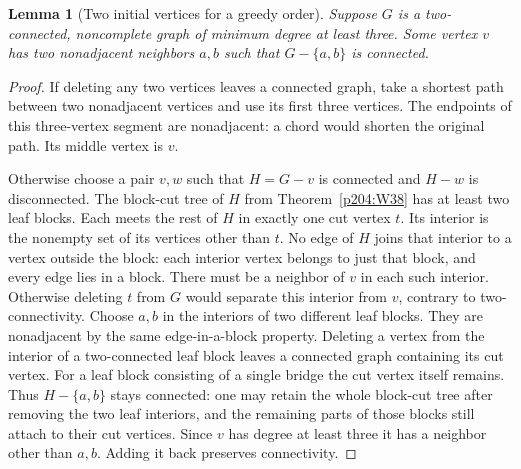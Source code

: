 \documentclass[11pt,oneside,openany]{book}
\theoremstyle{plain}
\newtheorem{lemma}[theorem]{Lemma}
\theoremstyle{definition}
\theoremstyle{remark}
\begin{document}
\begin{lemma}[Two initial vertices for a greedy order]
\label{p204:brooks-order}
Suppose \(G\) is a two-connected, noncomplete graph of minimum degree
at least three. Some vertex \(v\) has two nonadjacent neighbors
\(a,b\) such that \(G-\{a,b\}\) is connected.
\end{lemma}
\begin{proof}
If deleting any two vertices leaves a connected graph, take a shortest
path between two nonadjacent vertices and use its first three
vertices. The endpoints of this three-vertex segment are nonadjacent:
a chord would shorten the original path. Its middle vertex is \(v\).

Otherwise choose a pair \(v,w\) such that \(H=G-v\) is connected
and \(H-w\) is disconnected. The block-cut tree of \(H\) from
Theorem~\ref{p204:W38} has at least two leaf blocks. Each meets
the rest of \(H\) in exactly one cut vertex \(t\). Its interior is
the nonempty set of its vertices other than \(t\). No edge of \(H\)
joins that interior to a vertex outside the block: each interior
vertex belongs to just that block, and every edge lies in a block.
There must be a neighbor of \(v\) in each such interior. Otherwise
deleting \(t\) from \(G\) would separate this interior from \(v\),
contrary to two-connectivity. Choose \(a,b\) in the interiors of
two different leaf blocks. They are nonadjacent by the same
edge-in-a-block property. Deleting a vertex from the interior of a
two-connected leaf block leaves a connected graph containing its
cut vertex. For a leaf block consisting of a single bridge the
cut vertex itself remains. Thus \(H-\{a,b\}\) stays connected:
one may retain the whole block-cut tree after removing the two
leaf interiors, and the remaining parts of those blocks still
attach to their cut vertices. Since \(v\) has degree at least
three it has a neighbor other than \(a,b\). Adding it back
preserves connectivity.
\end{proof}
\end{document}
